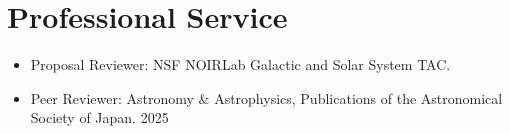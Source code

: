 \documentclass[letterpaper,10pt]{article}
\begin{document}

\section*{Professional Service}

\begin{itemize}[label=$\blacktriangleright$]
\item   Proposal Reviewer: NSF NOIRLab Galactic and Solar System TAC. 

\item Peer Reviewer: Astronomy \& Astrophysics, Publications of the Astronomical Society of Japan.  2025

 \end{itemize}


\end{document}
